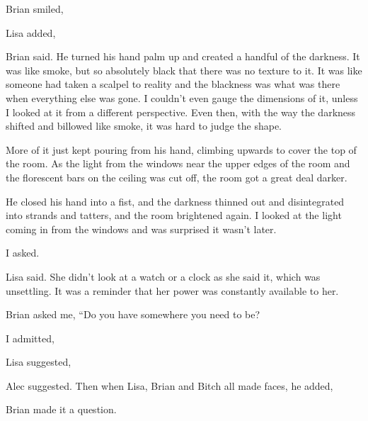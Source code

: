 Brian smiled, 

Lisa added, 

 Brian said. He turned his hand palm up and created a handful of the darkness. It was like smoke, but so absolutely black that there was no texture to it. It was like someone had taken a scalpel to reality and the blackness was what was there when everything else was gone. I couldn't even gauge the dimensions of it, unless I looked at it from a different perspective. Even then, with the way the darkness shifted and billowed like smoke, it was hard to judge the shape.

More of it just kept pouring from his hand, climbing upwards to cover the top of the room. As the light from the windows near the upper edges of the room and the florescent bars on the ceiling was cut off, the room got a great deal darker.

He closed his hand into a fist, and the darkness thinned out and disintegrated into strands and tatters, and the room brightened again. I looked at the light coming in from the windows and was surprised it wasn't later.

 I asked.

 Lisa said. She didn't look at a watch or a clock as she said it, which was unsettling. It was a reminder that her power was constantly available to her.

Brian asked me, “Do you have somewhere you need to be?

 I admitted, 

 Lisa suggested, 

 Alec suggested. Then when Lisa, Brian and Bitch all made faces, he added, 

 Brian made it a question.

